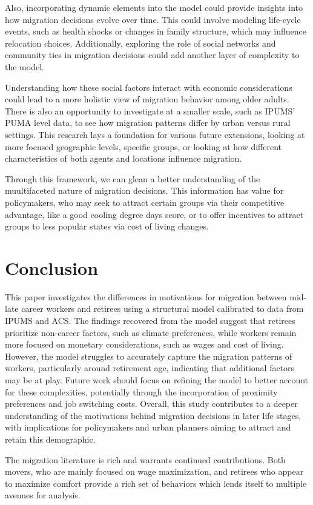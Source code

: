 \documentclass[11pt,a4paper]{article}
\begin{document}
Also, incorporating dynamic elements into the model could provide insights into how migration decisions evolve over time. This could involve modeling life-cycle events, such as health shocks or changes in family structure, which may influence relocation choices. Additionally, exploring the role of social networks and community ties in migration decisions could add another layer of complexity to the model. 

Understanding how these social factors interact with economic considerations could lead to a more holistic view of migration behavior among older adults. There is also an opportunity to investigate at a smaller scale, such as IPUMS' PUMA level data, to see how migration patterns differ by urban versus rural settings. This research lays a foundation for various future extensions, looking at more focused geographic levels, specific groups, or looking at how different characteristics of both agents and locations influence migration.

Through this framework, we can glean a better understanding of the muultifaceted nature of migration decisions. This information has value for policymakers, who may seek to attract certain groups via their competitive advantage, like a good cooling degree days score, or to offer incentives to attract groups to less popular states via cost of living changes.



\section{Conclusion}
\label{sec:conclusion}

This paper investigates the differences in motivations for migration between mid-late career workers and retirees using a structural model calibrated to data from IPUMS and ACS. The findings recovered from the model suggest that retirees prioritize non-career factors, such as climate preferences, while workers remain more focused on monetary considerations, such as wages and cost of living. However, the model struggles to accurately capture the migration patterns of workers, particularly around retirement age, indicating that additional factors may be at play. Future work should focus on refining the model to better account for these complexities, potentially through the incorporation of proximity preferences and job switching costs. Overall, this study contributes to a deeper understanding of the motivations behind migration decisions in later life stages, with implications for policymakers and urban planners aiming to attract and retain this demographic.

The migration literature is rich and warrants continued contributions. Both movers, who are mainly focused on wage maximization, and retirees who appear to maximize comfort provide a rich set of behaviors which lends itself to multiple avenues for analysis. 

\newpage



\printbibliography
\end{document}
